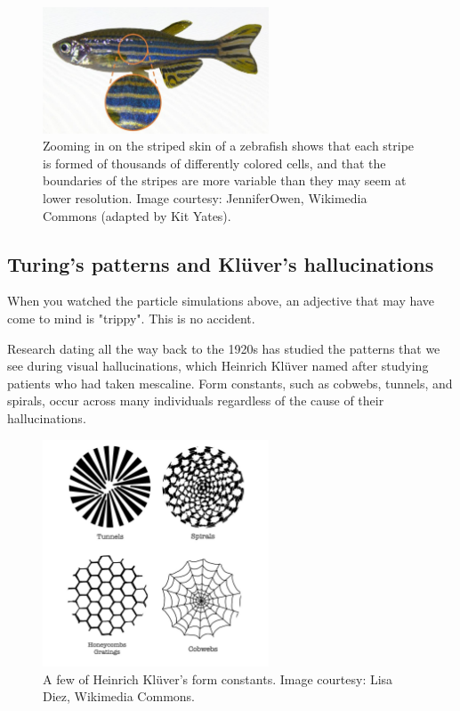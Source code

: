 {\begin{figure}[h]
\centering
\mySfFamily
\includegraphics[width = 0.6\textwidth]{../images/zebrafish_zoom.jpg}
\caption{Zooming in on the striped skin of a zebrafish shows that each stripe is formed of thousands of differently colored cells, and that the boundaries of the stripes are more variable than they may seem at lower resolution. Image courtesy: JenniferOwen, Wikimedia Commons (adapted by Kit Yates).}
\label{fig:zebrafish_zoom}
\end{figure}

\FloatBarrier
{}
\subsection{Turing's patterns and Klüver's hallucinations}

When you watched the particle simulations above, an adjective that may have come to mind is "trippy". This is no accident.

Research dating all the way back to the 1920s has studied the patterns that we see during visual hallucinations, which Heinrich Klüver named  after studying patients who had taken mescaline. Form constants, such as cobwebs, tunnels, and spirals, occur across many individuals regardless of the cause of their hallucinations.

\begin{figure}[h]
\centering
\mySfFamily
\includegraphics[width = 0.6\textwidth]{../images/form_constants.png}
\caption{A few of Heinrich Klüver's form constants. Image courtesy: Lisa Diez, Wikimedia Commons.}
\label{fig:form_constants}
\end{figure}

}
